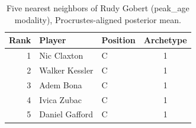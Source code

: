 \begin{table}[htbp]
  \centering\small
  \begin{tabular}{rllc}
    \toprule
    Rank & Player & Position & Archetype \\
    \midrule
    1 & Nic Claxton & C & 1 \\
    2 & Walker Kessler & C & 1 \\
    3 & Adem Bona & C & 1 \\
    4 & Ivica Zubac & C & 1 \\
    5 & Daniel Gafford & C & 1 \\
    \bottomrule
  \end{tabular}
  \caption{Five nearest neighbors of Rudy Gobert (peak_age modality), Procrustes-aligned posterior mean.}
  \label{tab:Rudy_Gobert_neighbors_peak_age}
\end{table}

